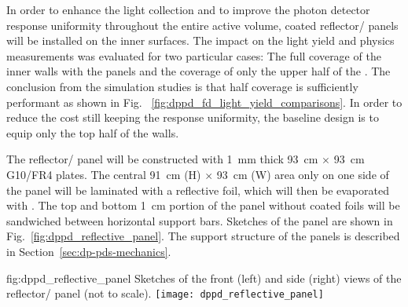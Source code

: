 In order to enhance the light collection and to improve the photon detector response uniformity throughout the entire  active volume,  coated reflector/ panels will be installed on the  inner surfaces. The impact on the light yield and physics measurements was evaluated for two particular cases: The full coverage of the  inner walls with the panels and the coverage of only the upper half of the . The conclusion from the simulation studies is that half coverage is sufficiently performant as shown in Fig. ~\ref{fig:dppd_fd_light_yield_comparisons}. In order to reduce the cost still keeping the  response uniformity, the baseline design is to equip only the top half of the  walls.

The reflector/ panel will be constructed with \SI{1}{\mm} thick \SI{93}{\cm} $\times$ \SI{93}{\cm} G10/FR4 plates. The central \SI{91}{\cm} (H) $\times$ \SI{93}{\cm} (W) area only on one side of the panel will be laminated with a reflective foil, which will then be evaporated with . The top and bottom \SI{1}{\cm} portion of the panel without coated foils will be sandwiched between horizontal support bars. Sketches of the panel are shown in Fig.~\ref{fig:dppd_reflective_panel}. The support structure of the panels is described in Section~\ref{sec:dp-pds-mechanics}. 
\begin{dunefigure}{fig:dppd_reflective_panel}
{Sketches of the front (left) and side (right) views of the reflector/ panel (not to scale).}
\texttt{[image: dppd\_reflective\_panel]}
\end{dunefigure}
